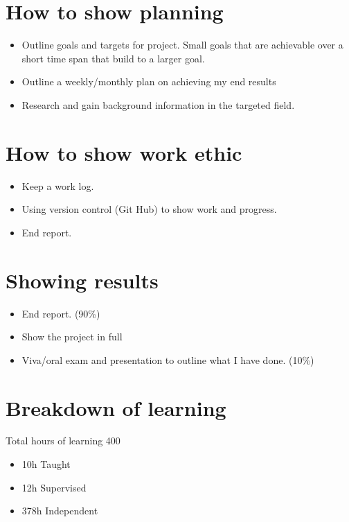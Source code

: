 \section{How to show planning}\label{how-to-show-planning}

\begin{itemize}
\item
  Outline goals and targets for project. Small goals that are achievable
  over a short time span that build to a larger goal.
\item
  Outline a weekly/monthly plan on achieving my end results
\item
  Research and gain background information in the targeted field.
\end{itemize}

\section{How to show work ethic}\label{how-to-show-work-ethic}

\begin{itemize}
\tightlist
\item
  Keep a work log.
\item
  Using version control (Git Hub) to show work and progress.
\item
  End report.
\end{itemize}

\section{Showing results}\label{showing-results}

\begin{itemize}
\tightlist
\item
  End report. (90\%)
\item
  Show the project in full
\item
  Viva/oral exam and presentation to outline what I have done. (10\%)
\end{itemize}

\section{Breakdown of learning}\label{breakdown-of-learning}

Total hours of learning 400

\begin{itemize}
\tightlist
\item
  10h Taught
\item
  12h Supervised
\item
  378h Independent
\end{itemize}

